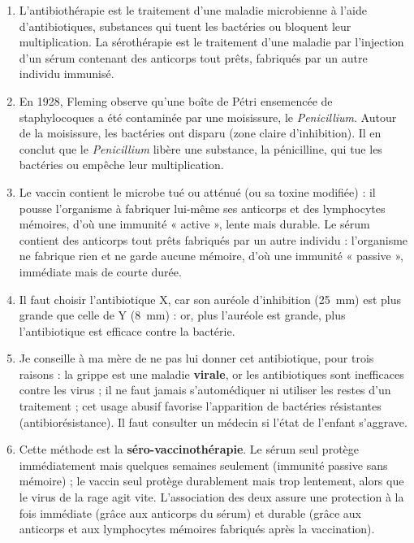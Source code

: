 \documentclass[11pt]{article}
\begin{document}
\begin{corrige}
\begin{enumerate}
\item L'antibiothérapie est le traitement d'une maladie microbienne à l'aide d'antibiotiques, substances qui tuent les bactéries ou bloquent leur multiplication. La sérothérapie est le traitement d'une maladie par l'injection d'un sérum contenant des anticorps tout prêts, fabriqués par un autre individu immunisé.
\item En 1928, Fleming observe qu'une boîte de Pétri ensemencée de staphylocoques a été contaminée par une moisissure, le \emph{Penicillium}. Autour de la moisissure, les bactéries ont disparu (zone claire d'inhibition). Il en conclut que le \emph{Penicillium} libère une substance, la pénicilline, qui tue les bactéries ou empêche leur multiplication.
\item Le vaccin contient le microbe tué ou atténué (ou sa toxine modifiée) : il pousse l'organisme à fabriquer lui-même ses anticorps et des lymphocytes mémoires, d'où une immunité « active », lente mais durable. Le sérum contient des anticorps tout prêts fabriqués par un autre individu : l'organisme ne fabrique rien et ne garde aucune mémoire, d'où une immunité « passive », immédiate mais de courte durée.
\item Il faut choisir l'antibiotique X, car son auréole d'inhibition (\SI{25}{mm}) est plus grande que celle de Y (\SI{8}{mm}) : or, plus l'auréole est grande, plus l'antibiotique est efficace contre la bactérie.
\item Je conseille à ma mère de ne pas lui donner cet antibiotique, pour trois raisons : la grippe est une maladie \textbf{virale}, or les antibiotiques sont inefficaces contre les virus ; il ne faut jamais s'automédiquer ni utiliser les restes d'un traitement ; cet usage abusif favorise l'apparition de bactéries résistantes (antibiorésistance). Il faut consulter un médecin si l'état de l'enfant s'aggrave.
\item Cette méthode est la \textbf{séro-vaccinothérapie}. Le sérum seul protège immédiatement mais quelques semaines seulement (immunité passive sans mémoire) ; le vaccin seul protège durablement mais trop lentement, alors que le virus de la rage agit vite. L'association des deux assure une protection à la fois immédiate (grâce aux anticorps du sérum) et durable (grâce aux anticorps et aux lymphocytes mémoires fabriqués après la vaccination).
\end{enumerate}
\end{corrige}
\end{document}
